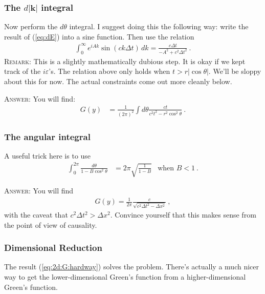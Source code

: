 \documentclass[12pt]{article}
\numberwithin{equation}{subsection}    %
\renewcommand{\vec}[1]{\mathbf{#1}} %
\begin{document}
\subsubsection{The $d|\vec k|$ integral}

Now perform the $d\theta$ integral. I suggest doing this the following way: write the result of (\ref{eq:dE}) into a sine function. Then use the relation
\begin{align}
	\int_0^\infty e^{iAk}\sin(ck\Delta t)\, dk = \frac{c\Delta t}{-A^2 + c^2\Delta t^2} \ .
\end{align}
\textsc{Remark:} This is a slightly mathematically dubious step. It is okay if we kept track of the $i\varepsilon$'s. The relation above only holds when $t > r|\cos\theta|$. We'll be sloppy about this for now. The actual constraints come out more cleanly below.

\textsc{Answer}: You will find:
\begin{align}
	G(y) &= \frac{1}{(2\pi)^2} \int d\theta \frac{ct}{c^2t^2 - r^2\cos^2\theta} 
	\ .
\end{align}

\subsubsection{The angular integral}

A useful trick here is to use
\begin{align}
	\int_0^{2\pi} \frac{d\theta}{1-B\cos^2\theta} &= 2\pi \sqrt{\frac{1}{1-B}} 
		&
	\text{when }B<1
	\ .
\end{align}

\textsc{Answer}: You will find
\begin{align}
	G(y) = \frac{1}{2\pi} \frac{c}{\sqrt{c^2 \Delta t^2 - \Delta x^2}} \ ,
	\label{eq:2d:G:hardway}
\end{align}
with the caveat that $c^2\Delta t^2 > \Delta x^2$. Convince yourself that this makes sense from the point of view of causality.


\subsubsection{Dimensional Reduction}


The result (\ref{eq:2d:G:hardway}) solves the problem. 
%
There's actually a much nicer way to get the lower-dimensional Green's function from a higher-dimensional Green's function. 
\end{document}

